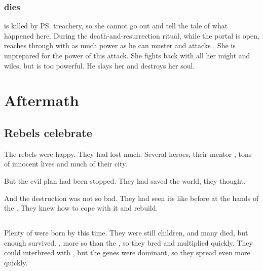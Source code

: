 \subsubsection{\Vexstrasshin{} dies}
\Vexstrasshin{} is killed by \ps{\Daggerrain} treachery, so she cannot go out and tell the tale of what happened here. 
During the death-and-resurrection ritual, while the portal is open, \Daggerrain{} reaches through with as much power as he can muster and attacks \Vexstrasshin. 
She is unprepared for the power of this attack. 
She fights back with all her might and wiles, but \Daggerrain{} is too powerful. 
He slays her and destroys her soul. 















\section{Aftermath}









\subsection{Rebels celebrate}
The \nephilic{} rebels were happy.
They had lost much: 
Several heroes, their mentor \Vexstrasshin{}, tons of innocent lives and much of their city. 

But the evil plan had been stopped. 
They had saved the world, they thought. 

And the destruction was not so bad. 
They had seen its like before at the hands of the \dragons. 
They knew how to cope with it and rebuild. 









\subsection{\Humans}
Plenty of \humans{} were born by this time. 
They were still children, and many died, but enough survived. 
, more so than the \nephilim, so they bred and multiplied quickly. 
They could interbreed with \nephilim, but the \human{} genes were dominant, so they spread even more quickly. 

